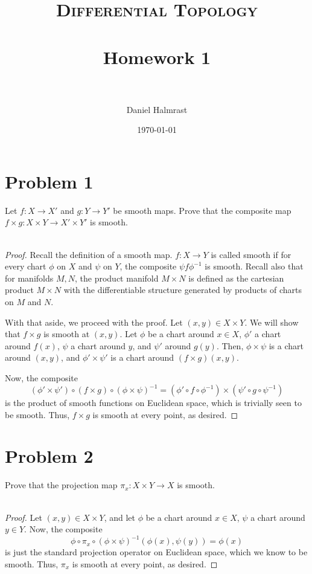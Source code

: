 \documentclass[fontsize=11pt]{scrartcl} %
\title{	
\normalfont \normalsize 
\textsc{Differential Topology} \\ [25pt] %
\horrule{0.5pt} \\[0.4cm] %
\huge Homework 1 \\ %
\horrule{2pt} \\[0.5cm] %
}
\author{Daniel Halmrast} %
\date{\normalsize\today} %
\numberwithin{equation}{section} %
\numberwithin{figure}{section} %
\numberwithin{table}{section} %
\begin{document}
\maketitle %

\section*{Problem 1}
Let $f:X\to X'$ and $g:Y\to Y'$ be smooth maps. Prove that the composite map
$f\times g:X\times Y\to X'\times Y'$ is smooth.
\\
\\
\begin{proof}
    Recall the definition of a smooth map. $f:X\to Y$ is called smooth if for
    every chart $\phi$ on $X$ and $\psi$ on $Y$, the composite $\psi f\phi^{-1}$
    is smooth. Recall also that for manifolds $M,N$, the product manifold
    $M\times N$ is defined as the cartesian product $M\times N$ with the
    differentiable structure generated by products of charts on $M$ and $N$.

    With that aside, we proceed with the proof. Let $(x,y)\in X\times Y$. We
    will show that $f\times g$ is smooth at $(x,y)$. Let $\phi$ be a chart
    around $x\in X$, $\phi'$ a chart around $f(x)$, $\psi$ a chart around $y$,
    and $\psi'$ around $g(y)$. Then, $\phi\times \psi$ is a chart around
    $(x,y)$, and $\phi'\times \psi'$ is a chart around $(f\times g)(x,y)$.

    Now, the composite 
    \[
        (\phi'\times \psi')\circ (f\times g)\circ (\phi\times
        \psi)^{-1} = (\phi'\circ f\circ \phi^{-1})\times(\psi'\circ g\circ
        \psi^{-1})
    \]
    is the product of smooth functions on Euclidean space, which is trivially
    seen to be smooth. Thus, $f\times g$ is smooth at every point, as desired.
\end{proof}

\newpage

\section*{Problem 2}
Prove that the projection map $\pi_x:X\times Y\to X$ is smooth.
\\
\\
\begin{proof}
    Let $(x,y)\in X\times Y$, and let $\phi$ be a chart around $x\in X$, $\psi$
    a chart around $y\in Y$. Now, the composite
    \[
        \phi\circ\pi_x\circ(\phi\times \psi)^{-1}(\phi(x),\psi(y)) = \phi(x)
    \]
    is just the standard projection operator on Euclidean space, which we know
    to be smooth. Thus, $\pi_x$ is smooth at every point, as desired.
\end{proof}
\end{document}

